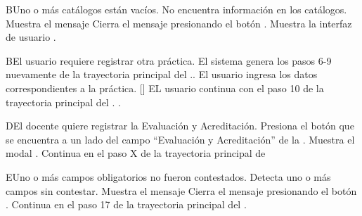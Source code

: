 
\begin{UCtrayectoriaA}{B}{Uno o más catálogos están vacíos}.
	\UCpaso No encuentra información en los catálogos.
    \UCpaso Muestra el mensaje 
    \UCpaso[\UCactor] Cierra el mensaje presionando el botón .
	\UCpaso Muestra la interfaz de usuario .
\end{UCtrayectoriaA}


\begin{UCtrayectoriaA}{B}{El usuario requiere registrar otra práctica}.
    \UCpaso El sistema genera los pasos 6-9 nuevamente de la trayectoria principal del ..
    \UCpaso[\UCactor] El usuario ingresa los datos correspondientes a la práctica.
    \UCpaso{}[\UCactor] EL usuario continua con el paso 10 de la trayectoria principal del .
    .
\end{UCtrayectoriaA}


\begin{UCtrayectoriaA}{D}{El docente quiere registrar la Evaluación y Acreditación}.
	\UCpaso[\UCactor] Presiona el botón \BtnModal que se encuentra a un lado del campo ``Evaluación y Acreditación'' de la .
	\UCpaso Muestra el modal .
	\UCpaso Continua en el paso X de la trayectoria principal de 
\end{UCtrayectoriaA}


\begin{UCtrayectoriaA}{E}{Uno o más campos obligatorios no fueron contestados.}
	\UCpaso Detecta uno o más campos sin contestar.
    \UCpaso Muestra el mensaje 
    \UCpaso[\UCactor] Cierra el mensaje presionando el botón .
    \UCpaso Continua en el paso 17 de la trayectoria principal del .
\end{UCtrayectoriaA}
